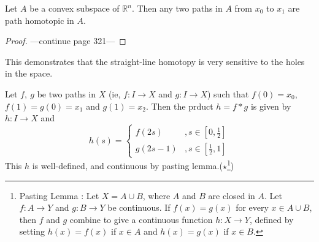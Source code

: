 \begin{remark}
	Let $A$ be a convex subspace of $\mathbb{R}^n$.
	Then any two paths in $A$ from $x_0$ to $x_1$ are path homotopic in $A$.
\end{remark}
\begin{proof}
	---continue page 321---
\end{proof}

\begin{remark}\cite[\S{}51 Example 2 pp. 321]{munkres}
\begin{commentary}
	This demonstrates that the straight-line homotopy is very sensitive to the holes in the space.
\end{commentary}
\end{remark}

\begin{definition}
	Let $f,\ g$ be two paths in $X$ (ie, $f : I \to X$ and $g: I \to X$) such that $f(0)=x_0$, $f(1)=g(0)=x_1$ and $g(1)=x_2$.
	Then the prduct $h = f \ast g$ is given by $h : I \to X$ and
	\[ h(s) = \begin{cases} f(2s) & , s \in [0,\frac{1}{2}] \\ g(2s-1) & , s \in [\frac{1}{2},1] \end{cases} \]
		This $h$ is well-defined, and continuous by pasting lemma.($\star$\footnote{Pasting Lemma : Let $X = A \cup B$, where $A$ and $B$ are closed in $A$.
		Let $f : A \to Y$ and $g : B \to Y$ be continuous.
		If $f(x) = g(x)$ for every $x \in A \cup B$, then $f$ and $g$ combine to give a continuous function $h : X \to Y$, defined by setting $h(x) = f(x)$ if $x \in A$ and $h(x) = g(x)$ if $x \in B$.})
\end{definition}

